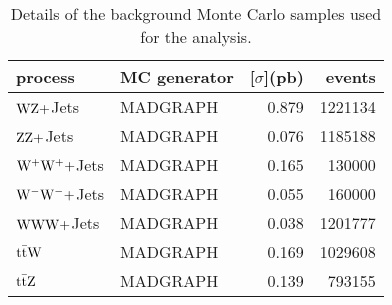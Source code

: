 \begin{table}[htb]
    \centering
\begin{tabular}{llrr}
    \toprule
process & MC generator & \unit[$\sigma$]{(pb)} & events \\
\midrule
$\mathrm{W}\mathrm{Z}+$Jets                                          & MADGRAPH & 0.879 & 1221134  \\
$\mathrm{Z}\mathrm{Z}+$Jets                                          & MADGRAPH & 0.076 & 1185188  \\
$\mathrm{W}^{+}\mathrm{W}^{+}+$Jets                                  & MADGRAPH & 0.165        & 130000    \\
$\mathrm{W}^{-}\mathrm{W}^{-}+$Jets                                  & MADGRAPH & 0.055        & 160000    \\
$\mathrm{W}\mathrm{W}\mathrm{W}+$Jets                                       & MADGRAPH & 0.038        & 1201777  \\
$\mathrm{t}\bar{\mathrm{t}} \mathrm{W}$                                         & MADGRAPH & 0.169 & 1029608  \\
$\mathrm{t}\bar{\mathrm{t}} \mathrm{Z}$                                         & MADGRAPH & 0.139        & 793155    \\
\bottomrule
\end{tabular}
\caption{Details of the background Monte Carlo samples used for the analysis.}
\label{tab:background_mc}
\end{table}
